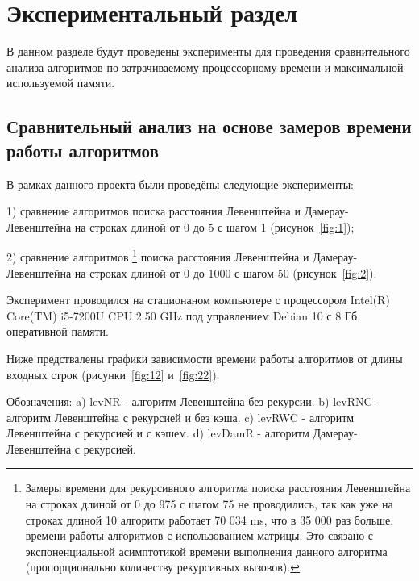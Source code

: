 \chapter{Экспериментальный раздел}
\label{cha:research}
    В данном разделе будут проведены эксперименты для проведения 
    сравнительного анализа алгоритмов по затрачиваемому процессорному 
    времени и максимальной используемой памяти.
    \section{Сравнительный анализ на основе замеров времени работы алгоритмов}
        В рамках данного проекта были проведёны следующие эксперименты:

        1) сравнение алгоритмов поиска расстояния Левенштейна и Дамерау-Левенштейна
        на строках длиной от 0 до 5 с шагом 1 (рисунок~\ref{fig:1});
        
        2) сравнение алгоритмов \footnote{Замеры времени для рекурсивного алгоритма поиска расстояния Левенштейна
        на строках длиной от 0 до 975 с шагом 75 не проводились, так как уже на
        строках длиной 10 алгоритм работает 70 034 ms, что в 35 000 раз больше, 
        времени работы алгоритмов с использованием матрицы. Это связано с экспоненциальной асимптотикой
        времени выполнения данного алгоритма (пропорционально количеству
        рекурсивных вызовов).} поиска расстояния Левенштейна и Дамерау-Левенштейна
        на строках длиной от 0 до 1000 с шагом 50 (рисунок~\ref{fig:2}).
        
        Эксперимент проводился на стационаном компьютере с процессором
        Intel(R) Core(TM) i5-7200U CPU 2.50 GHz
        под управлением Debian 10 с 8 Гб оперативной памяти.

        Ниже предствалены графики зависимости времени работы алгоритмов от длины входных строк
        (рисунки~\ref{fig:12} и~\ref{fig:22}).

        Обозначения:\newline
            a) levNR - алгоритм Левенштейна без рекурсии.\newline
            b) levRNC - алгоритм Левенштейна с рекурсией и без кэша.\newline
            c) levRWC - алгоритм Левенштейна с рекурсией и с кэшем.\newline
            d) levDamR - алгоритм Дамерау-Левенштейна с рекурсией.\newline

